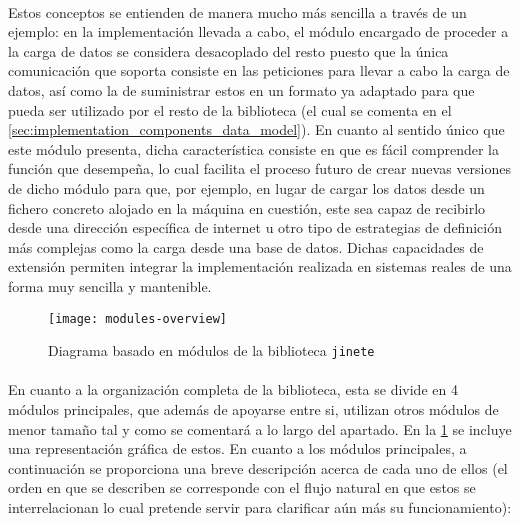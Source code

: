 \documentclass{subfiles}
\begin{document}
          \paragraph{}
          Estos conceptos se entienden de manera mucho más sencilla a través de un ejemplo: en la implementación llevada a cabo, el módulo encargado de proceder a la carga de datos se considera desacoplado del resto puesto que la única comunicación que soporta consiste en las peticiones para llevar a cabo la carga de datos, así como la de suministrar estos en un formato ya adaptado para que pueda ser utilizado por el resto de la biblioteca (el cual se comenta en el \cref{sec:implementation_components_data_model}). En cuanto al sentido único que este módulo presenta, dicha característica consiste en que es fácil comprender la función que desempeña, lo cual facilita el proceso futuro de crear nuevas versiones de dicho módulo para que, por ejemplo, en lugar de cargar los datos desde un fichero concreto alojado en la máquina en cuestión, este sea capaz de recibirlo desde una dirección específica de internet u otro tipo de estrategias de definición más complejas como la carga desde una base de datos. Dichas capacidades de extensión permiten integrar la implementación realizada en sistemas reales de una forma muy sencilla y mantenible.

          \begin{figure}[ht]
            \centering
            \texttt{[image: modules-overview]}
            \caption{Diagrama basado en módulos de la biblioteca \texttt{jinete}}
            \label{img:modules_overview}
          \end{figure}

          \paragraph{}
          En cuanto a la organización completa de la biblioteca, esta se divide en 4 módulos principales, que además de apoyarse entre si, utilizan otros módulos de menor tamaño tal y como se comentará a lo largo del apartado. En la \cref{img:modules_overview} se incluye una representación gráfica de estos. En cuanto a los módulos principales, a continuación se proporciona una breve descripción acerca de cada uno de ellos (el orden en que se describen se corresponde con el flujo natural en que estos se interrelacionan lo cual pretende servir para clarificar aún más su funcionamiento):
\end{document}
